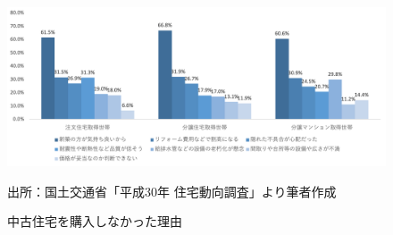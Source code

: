 \documentclass[a4paper,fontsize=11pt,report,notitlepage,line_length=38zw,number_of_lines=40,dvipdfmx]{jlreq}
\begin{document}
\begin{figure}
 \centering
 \includegraphics[width=14cm]{reason.png}
 \caption{中古住宅を購入しなかった理由}
 出所：国土交通省「平成30年 住宅動向調査」より筆者作成
 \label{reason}
\end{figure}


\end{document}
